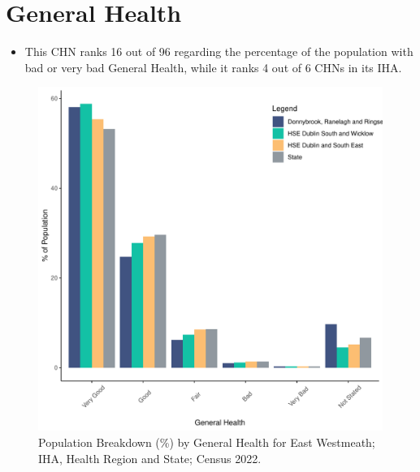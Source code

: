 \documentclass{article}
\begin{document}
\pagebreak

\section{General Health}\label{sect:GenHealth}
\begin{itemize}
\item  This CHN ranks  16 out of 96 regarding the percentage of the population with bad or very bad General Health, while it ranks   4 out of 6 CHNs in its IHA.
\end{itemize}
\begin{figure}[h]
	\centering
	\includegraphics[width = 150mm]{../figures/GenED.pdf}
	\caption{Population Breakdown (\%) by General Health for East Westmeath; IHA, Health Region and State;  Census 2022.}
	\label{fig:2ae19629-1a6a-13a3-e055-000000000001}
	\end{figure}
\end{document}
